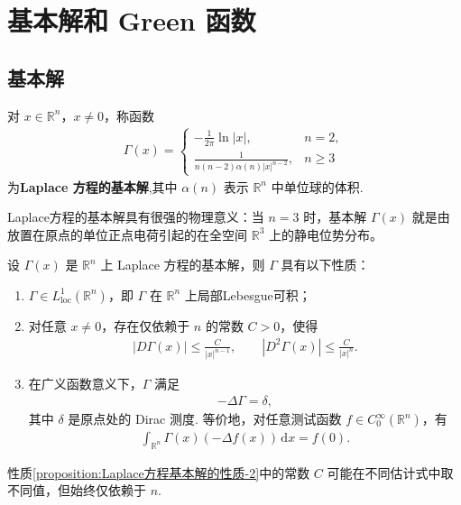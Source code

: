 \documentclass[../../main.tex]{subfiles}%
\begin{document}
\section{基本解和 Green 函数}

\subsection{基本解}

\begin{definition}
对 $x\in\mathbb{R}^n$，$x\neq 0$，称函数
\begin{align}
\varGamma (x) = \begin{cases}
-\frac{1}{2\pi}\ln|x|, & n=2, \\
\frac{1}{n(n-2)\alpha(n)|x|^{n-2}}, & n\geqslant 3
\end{cases} \label{eq:fundamental}
\end{align}
为\textbf{Laplace 方程的基本解},其中 $\alpha(n)$ 表示 $\mathbb{R}^n$ 中单位球的体积.
\end{definition}
\begin{remark}
Laplace方程的基本解具有很强的物理意义：当 $n=3$ 时，基本解 $\varGamma (x)$ 就是由放置在原点的单位正点电荷引起的在全空间 $\mathbb{R}^3$ 上的静电位势分布。
\end{remark}

\begin{proposition}\label{proposition:Laplace方程基本解的性质}
设 $\varGamma (x)$ 是 $\mathbb{R}^n$ 上 Laplace 方程的基本解，则 $\varGamma $ 具有以下性质：
\begin{enumerate}[(1)]
\item\label{proposition:Laplace方程基本解的性质-1} $\varGamma \in L^1_{\mathrm{loc}}(\mathbb{R}^n)$，即 $\varGamma $ 在 $\mathbb{R}^n$ 上局部Lebesgue可积；

\item\label{proposition:Laplace方程基本解的性质-2} 对任意 $x\neq 0$，存在仅依赖于 $n$ 的常数 $C>0$，使得
\begin{align*}
|D\varGamma (x)| \leqslant \frac{C}{|x|^{n-1}},\qquad |D^2\varGamma (x)| \leqslant \frac{C}{|x|^{n}}.
\end{align*}

\item\label{proposition:Laplace方程基本解的性质-3} 在广义函数意义下，$\varGamma $ 满足
\begin{align*}
-\Delta \varGamma  = \delta,
\end{align*}
其中 $\delta$ 是原点处的 Dirac 测度. 等价地，对任意测试函数 $f\in C_0^\infty(\mathbb{R}^n)$，有
\begin{align*}
\int_{\mathbb{R}^n} \varGamma (x)(-\Delta f(x))\,\mathrm{d}x = f(0). 
\end{align*}
\end{enumerate}
\end{proposition}
\begin{remark}
性质\ref{proposition:Laplace方程基本解的性质-2}中的常数 $C$ 可能在不同估计式中取不同值，但始终仅依赖于 $n$.
\end{remark}
\end{document}
